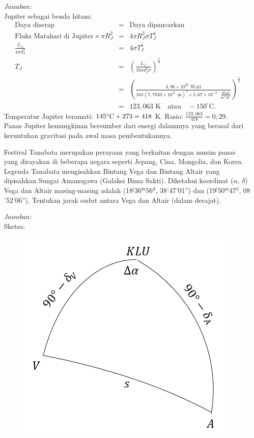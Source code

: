 \documentclass[11pt,fleqn]{exam}
\begin{document}
\begin{questions}
\textit{Jawaban:} \\
Jupiter sebagai benda hitam:
\begin{eqnarray*}
\text{Daya diserap}&=&\text{Daya dipancarkan}\\
\text{Fluks Matahari di Jupiter} \times \pi R_J^2&=&4\pi R_J^2\sigma T_J^4\\
\frac{L_{\odot}}{4\pi d_J^2}&=&4\sigma T_J^4\\
T_J&=& \left(\frac{L_{\odot}}{16\pi d_J^2\sigma} \right)^{\frac{1}{4}}\\
&=& \left(\frac{3,96\times 10^{26}\text{ Watt}}{16\pi(7,7833\times 10^{11}\text{ m})^2\times 5,67\times 10^{-8}\text{ }\frac{\text{Watt}}{\text{m}^2\text{ K}^4}} \right)^{\frac{1}{4}}\\
&=&123,063\text{ K} \quad \text{atau} \quad -150^{\circ}\text{C}.
\end{eqnarray*}
Temperatur Jupiter teramati: $145\degree\text{C}+273=418$ K. Rasio: $\frac{123,063}{418}=0,29$.\\
Panas Jupiter kemungkinan bersumber dari energi dalammya yang berasal dari keruntuhan gravitasi pada awal masa pembentukannya.

\question Festival Tanabata merupakan perayaan yang berkaitan dengan musim panas yang dirayakan di beberapa negara seperti Jepang, Cina, Mongolia, dan Korea. Legenda Tanabata mengisahkan Bintang Vega dan Bintang Altair yang dipisahkan Sungai Amanogawa (Galaksi Bima Sakti). Diketahui koordinat ($\alpha$, $\delta$) Vega dan Altair masing-masing adalah (18$^\text{j}$36$^\text{m}$56$^\text{d}$, 38$^{\circ}$47'01'') dan (19$^\text{j}$50$^\text{m}$47$^\text{d}$, 08$^{\circ}$52'06''). Tentukan jarak sudut antara Vega dan Altair (dalam derajat).

\textit{Jawaban: }\\
Sketsa:
\begin{figure}[h!]
\centering
\includegraphics[scale=0.8]{segbol.PNG}
\end{figure}


\end{questions}
\end{document}
